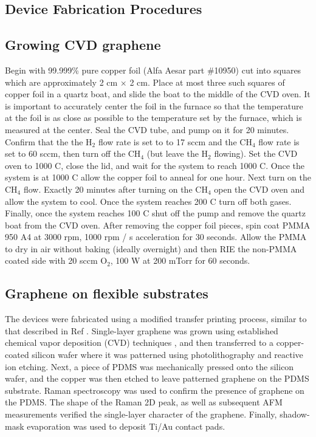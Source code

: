 \documentclass[edeposit,fullpage,draftthesis]{uiucthesis2009}
\begin{document}
\begin{appendices}

\chapter{Device Fabrication Procedures}
\label{appendix:fab}

\section{Growing CVD graphene}

    Begin with 99.999\% pure copper foil (Alfa Aesar part \#10950) cut into squares which are
    approximately 2 cm $\times$ 2 cm. Place at most three such squares of copper foil
    in a quartz boat, and slide the boat to the middle of the CVD oven. It is important
    to accurately center the foil in the furnace so that the temperature at the foil is as
    close as possible to the temperature set by the furnace, which is measured at the center.
    Seal the CVD tube, and pump on it for 20 minutes. Confirm that the the H$_2$ flow rate 
    is set to to 17 sccm and the CH$_4$ flow rate is set to 60 sccm, then turn off the CH$_4$
    (but leave the H$_2$ flowing). Set the CVD oven to 1000 C, close the lid, and wait for the
    system to reach 1000 C. Once the system is at 1000 C allow the copper foil to anneal for
    one hour. Next turn on the CH$_4$ flow. Exactly 20 minutes after turning on the CH$_4$
    open the CVD oven and allow the system to cool. Once the system reaches 200 C turn off
    both gases. Finally, once the system reaches 100 C shut off the pump and remove the 
    quartz boat from the CVD oven. After removing the copper foil pieces, spin coat PMMA 950 A4
    at 3000 rpm, 1000 rpm / s acceleration for 30 seconds. Allow the PMMA to dry in air without
    baking (ideally overnight) and then RIE the non-PMMA coated side with 20 sccm O$_2$, 100 W 
    at 200 mTorr for 60 seconds.
    
\section{Graphene on flexible substrates}

        The devices were fabricated using a modified transfer
        printing process, similar to that described in Ref \cite{Kim2009}.
        Single-layer graphene was grown using established chemical vapor deposition
        (CVD) techniques \cite{Li2009}, and then transferred to a copper-coated silicon
        wafer where it was patterned using photolithography and reactive ion etching.
        Next, a piece of PDMS was mechanically pressed onto the silicon wafer, and the
        copper was then etched to leave patterned graphene on the PDMS
        substrate\cite{Lee2010}. Raman spectroscopy was used to confirm the presence of
        graphene on the PDMS. The shape of the Raman 2D
        peak\cite{Ferrari2006}, as well as subsequent AFM measurements verified the
        single-layer character of the graphene. Finally, shadow-mask evaporation was
        used to deposit Ti/Au contact pads.


\end{appendices}
\end{document}
